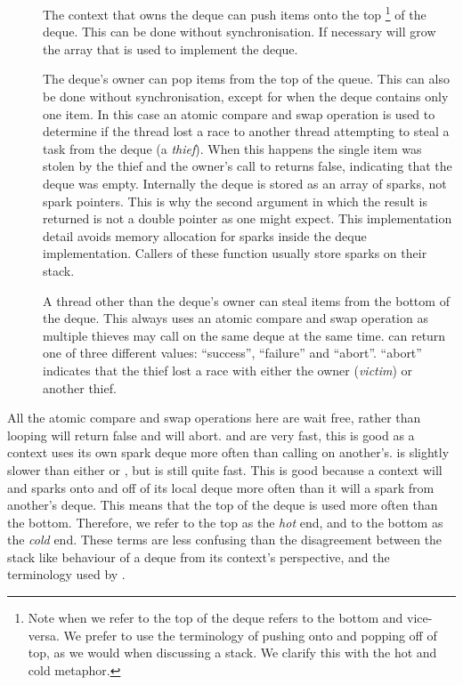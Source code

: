 \begin{description}

    \item[]
    The context that owns the deque can push items onto the top%
\footnote{
        Note when we refer to the top of the deque
        \citet{Chase_2005_wsdeque} refers to the bottom and vice-versa.
        We prefer to use the terminology of pushing onto and popping off of
        top, as we would when discussing a stack.
        We clarify this with the hot and cold metaphor.}
    of the deque.
    This can be done without synchronisation.
    If necessary
    \push will grow the array that is used to implement the
    deque.

    \item[]
    The deque's owner can pop items from the top of the queue.
    This can also be done without synchronisation,
    except for when the deque contains only one item.
    In this case an atomic compare and swap operation is used to
    determine if the thread lost a race to another thread attempting to
    steal a task from the deque (a \emph{thief}).
    When this happens the single item was stolen by the thief and the
    owner's call to \pop returns false,
    indicating that the deque was empty.
    Internally the deque is stored as an array of sparks, not spark
    pointers.
    This is why the second argument in which the result is returned is not a
    double pointer as one might expect.
    This implementation detail avoids memory allocation for sparks inside
    the deque implementation.
    Callers of these function usually store sparks on their stack.

    \item[]
    A thread other than the deque's owner can steal
    items from the bottom of the deque.
    This always uses an atomic compare and swap operation as multiple
    thieves may call \steal on the same deque at the same time.
    \steal can return one of three different values:
    ``success'', ``failure'' and ``abort''.
    ``abort'' indicates that the thief lost a race with either the owner
    (\emph{victim}) or another thief.

\end{description}

All the atomic compare and swap operations here are wait free,
rather than looping \pop will return false and \steal will abort.
\push and \pop are very fast, this is good as a context uses its own
spark deque more often than calling \steal on another's.
\steal is slightly slower than either \push or \pop,
but is still quite fast.
This is good because a context will
\push and \pop sparks onto and off of its local deque
more often than it will \steal a spark from another's deque.
This means that the top of the deque is used more often than the bottom.
Therefore, we refer to the top as the \emph{hot} end,
and to the bottom as the \emph{cold} end.
These terms are less confusing than the disagreement between the stack
like behaviour of a deque from its context's perspective,
and the terminology used by \citet{Chase_2005_wsdeque}.

